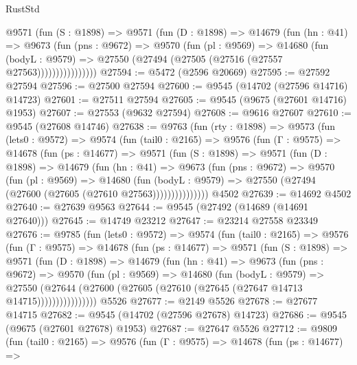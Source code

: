 \begin{lexlean}{RustStd}
\begin{coremodule}
              @9571
                (fun (S : @1898) =>
                @9571
                  (fun (D : @1898) =>
                  @14679
                    (fun (hn : @41) =>
                    @9673
                      (fun (pns : @9672) =>
                      @9570
                        (fun (pl : @9569) =>
                        @14680
                          (fun (bodyL : @9579) =>
                          @27550 (@27494 (@27505 (@27516 (@27557 @27563))))))))))))))))
@27594 := @5472 (@2596 @20669)
@27595 := @27592 @27594
@27596 := @27500 @27594
@27600 := @9545 (@14702 (@27596 @14716) @14723)
@27601 := @27511 @27594
@27605 := @9545 (@9675 (@27601 @14716) @1953)
@27607 := @27553 (@9632 @27594)
@27608 := @9616 @27607
@27610 := @9545 (@27608 @14746)
@27638 := @9763
    (fun (rty : @1898) =>
    @9573
      (fun (lets0 : @9572) =>
      @9574
        (fun (tail0 : @2165) =>
        @9576
          (fun (Γ : @9575) =>
          @14678
            (fun (ps : @14677) =>
            @9571
              (fun (S : @1898) =>
              @9571
                (fun (D : @1898) =>
                @14679
                  (fun (hn : @41) =>
                  @9673
                    (fun (pns : @9672) =>
                    @9570
                      (fun (pl : @9569) =>
                      @14680
                        (fun (bodyL : @9579) =>
                        @27550 (@27494 (@27600 (@27605 (@27610 @27563)))))))))))))))
    @4502
@27639 := @14692 @4502
@27640 := @27639 @9563
@27644 := @9545 (@27492 (@14689 (@14691 @27640)))
@27645 := @14749 @23212
@27647 := @23214 @27558 @23349
@27676 := @9785
    (fun (lets0 : @9572) =>
    @9574
      (fun (tail0 : @2165) =>
      @9576
        (fun (Γ : @9575) =>
        @14678
          (fun (ps : @14677) =>
          @9571
            (fun (S : @1898) =>
            @9571
              (fun (D : @1898) =>
              @14679
                (fun (hn : @41) =>
                @9673
                  (fun (pns : @9672) =>
                  @9570
                    (fun (pl : @9569) =>
                    @14680
                      (fun (bodyL : @9579) =>
                      @27550
                        (@27644
                          (@27600 (@27605 (@27610 (@27645 (@27647 @14713 @14715))))))))))))))))
    @5526
@27677 := @2149 @5526
@27678 := @27677 @14715
@27682 := @9545 (@14702 (@27596 @27678) @14723)
@27686 := @9545 (@9675 (@27601 @27678) @1953)
@27687 := @27647 @5526
@27712 := @9809
    (fun (tail0 : @2165) =>
    @9576
      (fun (Γ : @9575) =>
      @14678
        (fun (ps : @14677) =>

\end{coremodule}
\end{lexlean}
